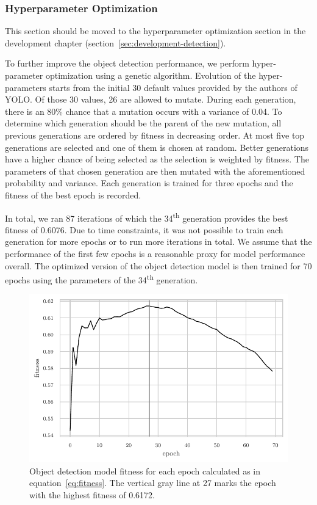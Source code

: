 \documentclass[draft,final]{vutinfth} %
\begin{document}
\subsubsection{Hyperparameter Optimization}
\label{sssec:yolo-hyp-opt}

This section should be moved to the hyperparameter optimization
section in the development chapter
(section~\ref{sec:development-detection}).

To further improve the object detection performance, we perform
hyper-parameter optimization using a genetic algorithm. Evolution of
the hyper-parameters starts from the initial 30 default values
provided by the authors of YOLO. Of those 30 values, 26 are allowed to
mutate. During each generation, there is an 80\% chance that a
mutation occurs with a variance of 0.04. To determine which generation
should be the parent of the new mutation, all previous generations are
ordered by fitness in decreasing order. At most five top generations
are selected and one of them is chosen at random. Better generations
have a higher chance of being selected as the selection is weighted by
fitness. The parameters of that chosen generation are then mutated
with the aforementioned probability and variance. Each generation is
trained for three epochs and the fitness of the best epoch is
recorded.

In total, we ran 87 iterations of which the 34\textsuperscript{th}
generation provides the best fitness of 0.6076. Due to time
constraints, it was not possible to train each generation for more
epochs or to run more iterations in total. We assume that the
performance of the first few epochs is a reasonable proxy for model
performance overall. The optimized version of the object detection
model is then trained for 70 epochs using the parameters of the
34\textsuperscript{th} generation.

\begin{figure}
  \centering
  \includegraphics{graphics/model_fitness_final.pdf}
  \caption[Optimized object detection fitness per epoch.]{Object
    detection model fitness for each epoch calculated as in
    equation~\ref{eq:fitness}. The vertical gray line at 27 marks the
    epoch with the highest fitness of 0.6172.}
  \label{fig:hyp-opt-fitness}
\end{figure}
\end{document}

